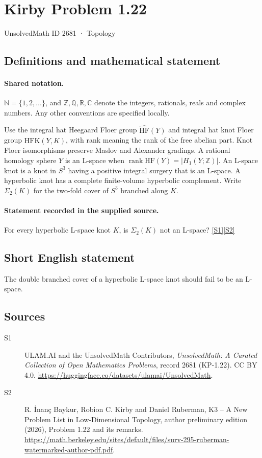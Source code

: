 \documentclass[11pt]{article}
\newcommand{\sref}[2]{\hyperlink{source:#1:#2}{[S#2]}}
\begin{document}
\setcounter{section}{2680}
\section{Kirby Problem 1.22}\label{2681}
{\small\sffamily UnsolvedMath ID 2681 · Topology}
\subsection{Definitions and mathematical statement}

\paragraph{Shared notation.}$\mathbb N=\{1,2,\ldots\}$, and $\mathbb Z,\mathbb Q,\mathbb R,\mathbb C$ denote the integers, rationals, reals and complex numbers. Any other conventions are specified locally.


Use the integral hat Heegaard Floer group $\widehat{\mathrm{HF}}(Y)$ and integral hat knot Floer group $\widehat{\mathrm{HFK}}(Y,K)$, with rank meaning the rank of the free abelian part. Knot Floer isomorphisms preserve Maslov and Alexander gradings. A rational homology sphere $Y$ is an L-space when $\operatorname{rank}\widehat{\mathrm{HF}}(Y)=|H_1(Y;\mathbb Z)|$. An L-space knot is a knot in $S^3$ having a positive integral surgery that is an L-space. A hyperbolic knot has a complete finite-volume hyperbolic complement. Write $\Sigma_2(K)$ for the two-fold cover of $S^3$ branched along $K$.
\paragraph{Statement recorded in the supplied source.}
For every hyperbolic L-space knot $K$, is $\Sigma_2(K)$ not an L-space? \sref{2681}{1}\sref{2681}{2}
\subsection{Short English statement}
The double branched cover of a hyperbolic L-space knot should fail to be an L-space.
\subsection{Sources}
\begin{description}
\item[\hypertarget{source:2681:1}{S1}] ULAM.AI and the UnsolvedMath Contributors, \emph{UnsolvedMath: A Curated Collection of Open Mathematics Problems}, record 2681 (KP-1.22). CC BY 4.0. \url{https://huggingface.co/datasets/ulamai/UnsolvedMath}.
\item[\hypertarget{source:2681:2}{S2}] R. \.{I}nan\c{c} Baykur, Robion C. Kirby and Daniel Ruberman, K3 -- A New Problem List in Low-Dimensional Topology, author preliminary edition (2026), Problem 1.22 and its remarks. \url{https://math.berkeley.edu/sites/default/files/surv-295-ruberman-watermarked-author-pdf.pdf}.
\end{description}
\label{end:2681}
\end{document}
